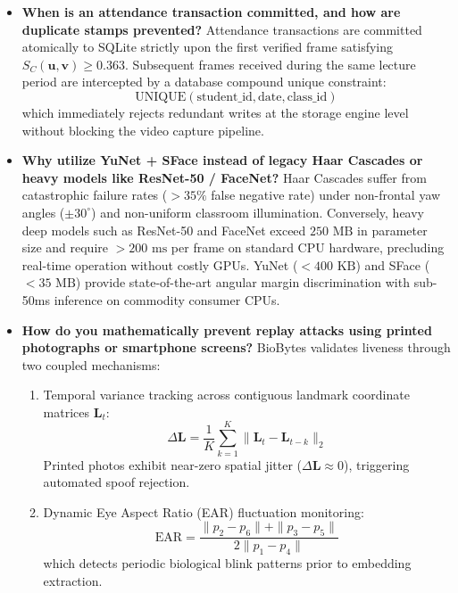 \begin{itemize}
    \item \textbf{When is an attendance transaction committed, and how are duplicate stamps prevented?}
    Attendance transactions are committed atomically to SQLite strictly upon the first verified frame satisfying $S_C(\mathbf{u}, \mathbf{v}) \geq 0.363$. Subsequent frames received during the same lecture period are intercepted by a database compound unique constraint:
    $$\text{UNIQUE}(\text{student\_id}, \text{date}, \text{class\_id})$$
    which immediately rejects redundant writes at the storage engine level without blocking the video capture pipeline.

    \item \textbf{Why utilize YuNet + SFace instead of legacy Haar Cascades or heavy models like ResNet-50 / FaceNet?}
    Haar Cascades suffer from catastrophic failure rates ($> 35\%$ false negative rate) under non-frontal yaw angles ($\pm 30^\circ$) and non-uniform classroom illumination. Conversely, heavy deep models such as ResNet-50 and FaceNet exceed $250\text{ MB}$ in parameter size and require $> 200\text{ ms}$ per frame on standard CPU hardware, precluding real-time operation without costly GPUs. YuNet ($< 400\text{ KB}$) and SFace ($< 35\text{ MB}$) provide state-of-the-art angular margin discrimination with sub-50ms inference on commodity consumer CPUs.

    \item \textbf{How do you mathematically prevent replay attacks using printed photographs or smartphone screens?}
    BioBytes validates liveness through two coupled mechanisms:
    \begin{enumerate}
        \item Temporal variance tracking across contiguous landmark coordinate matrices $\mathbf{L}_t$:
        $$\Delta \mathbf{L} = \frac{1}{K} \sum_{k=1}^K \|\mathbf{L}_{t} - \mathbf{L}_{t-k}\|_2$$
        Printed photos exhibit near-zero spatial jitter ($\Delta \mathbf{L} \approx 0$), triggering automated spoof rejection.
        \item Dynamic Eye Aspect Ratio (EAR) fluctuation monitoring:
        $$\text{EAR} = \frac{\|p_2 - p_6\| + \|p_3 - p_5\|}{2 \|p_1 - p_4\|}$$
        which detects periodic biological blink patterns prior to embedding extraction.
    \end{enumerate}
\end{itemize}

